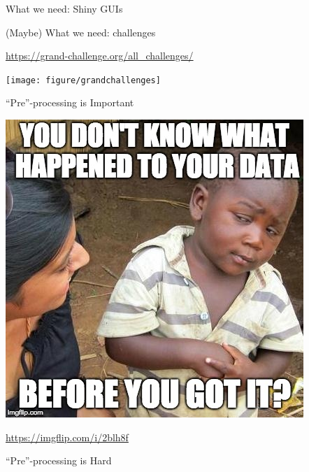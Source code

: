 \documentclass[ignorenonframetext,]{beamer}
\begin{document}
\begin{frame}{What we need: Shiny GUIs}
\protect\hypertarget{what-we-need-shiny-guis}{}

\begin{block}{(Maybe) What we need: challenges}

\url{https://grand-challenge.org/all_challenges/}

\texttt{[image: figure/grandchallenges]}

\end{block}

\begin{block}{“Pre”-processing is Important}

\includegraphics[width=1\linewidth]{figure/know_processing}

\url{https://imgflip.com/i/2blh8f}

\end{block}

\begin{block}{“Pre”-processing is Hard}


\end{block}
\end{frame}
\end{document}
